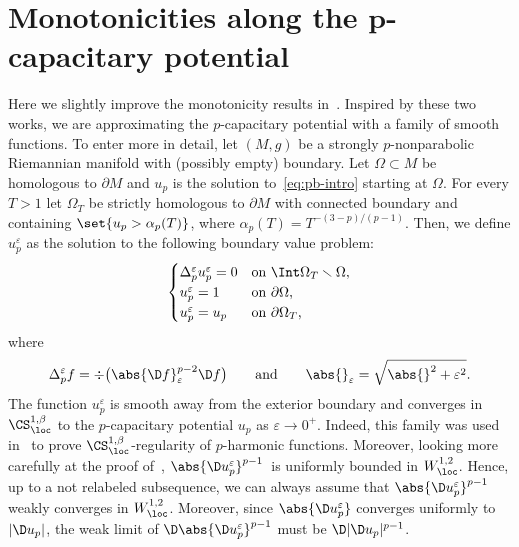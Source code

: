 \appendix

\section[Monotonicities along the p-capacitary potential]{Monotonicities along the $\boldsymbol{p}$-capacitary potential}
\label{app:monotonicities}
Here we slightly improve the monotonicity results in~\cite{agostiniani_riemannianpenroseinequalitynonlinear_2022,chan_monotonicitygreenfunctions_2022}. Inspired by these two works, we are approximating the $p$-capacitary potential with a family of smooth functions. To enter more in detail, let $(M,g)$ be a strongly $p$-nonparabolic Riemannian manifold with (possibly empty) boundary. Let $\Omega \subset M$ be homologous to $\partial M$ and $u_p$ is the solution to~\eqref{eq:pb-intro} starting at $\Omega$. For every $T>1$ let $\Omega_T$ be strictly homologous to $\partial M$ with connected boundary and containing $\set{u_p>\alpha_p(T)}$, where $\alpha_p(T) = T^{-(3-p)/(p-1)}$. Then, we define $u_p^\varepsilon$ as the solution to the following boundary value problem:
\begin{equation}\label{eq:pb-intro-eps}
 \begin{cases}
 \Delta_{p}^\varepsilon u^\varepsilon_p = 0 &\text{on $\Int\Omega_T \smallsetminus \Omega $,}\\
 u_p^\varepsilon=1 & \text{on $\partial \Omega$,}\\
 u_p^\varepsilon=u_p & \text{on $\partial\Omega_T$,}
 \end{cases}
\end{equation}
where
\[
 \Delta_{p}^\varepsilon f = \div\big( \abs{ \D f}_\varepsilon^{p-2} \D f\big) \qquad \text{and} \qquad {\abs{}}_\varepsilon= \sqrt{ \abs{}^2 +\varepsilon^2}.
\]
The function $u^\varepsilon_p$ is smooth away from the exterior boundary and converges in $\CS^{1,\beta}_{\loc}$ to the $p$-capacitary potential $u_p$ as $\varepsilon \to 0^+$. Indeed, this family was used in~\cite{dibenedetto_alphalocalregularityweak_1983} to prove $\CS^{1,\beta}_{\loc}$-regularity of $p$-harmonic functions. Moreover, looking more carefully at the proof of~\cite[Lemma~2.1]{lou_singularsetslocalsolutions_2008}, $\abs{\D u^\varepsilon_p}^{p-1}$~is uniformly bounded in $W^{1,2}_{\loc}$. Hence, up to a not relabeled subsequence, we can always assume that $\abs{ \D u_p^\varepsilon}^{p-1}$ weakly converges in $W^{1,2}_{\loc}$. Moreover, since $\abs{ \D u_p^\varepsilon}$ converges uniformly to~$| \D u_p |$, the weak limit of $\D \abs{ \D u_p^\varepsilon}^{p-1}$ must be $\D | \D u_p |^{p-1}$.

